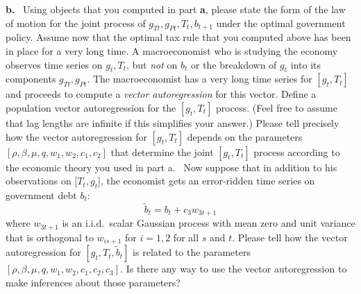 \medskip \noindent
{\bf b.} \ Using objects that you computed in part {\bf a}, please state
the form of the law of motion for the joint process of $g_{Tt},
g_{Pt}, T_t, b_{t+1}$ under the optimal government policy.
\medskip
{}  Assume now that the optimal tax
rule that you computed above has been in place for a very long
time.  A macroeconomist who is studying the  economy observes time
series on $g_t, T_t$, but {\it not\/} on  $b_t$ or the breakdown
of $g_t$ into its components $g_{Tt}, g_{Pt}$. The macroeconomist
has a very long time series for $[g_t, T_t]$ and proceeds to
compute a {\it vector autoregression\/} for this vector.
\medskip
{}  Define a population vector autoregression for
the $[g_t, T_t]$ process. (Feel free to assume that lag lengths
are infinite if this simplifies your answer.)
\medskip
{}  Please tell precisely how the vector
autoregression for $[g_t, T_t]$ depends on the parameters $[\rho,
\beta, \mu, q, w_1, w_2, c_1, c_2]$ that determine the joint
$[g_t, T_t]$ process according to the economic theory you used in
part a.
\medskip
{} \  Now suppose that in addition to his
observations on $[T_t, g_t$], the economist gets an error-ridden
time series on government debt $b_t$:
$$ \tilde b_t = b_t + c_3 w_{3t+1} $$
where $w_{3t+1}$ is an i.i.d.\ scalar Gaussian process with mean
zero and unit variance that is orthogonal to $w_{is+1}$ for
$i=1,2$ for all $s$ and $t$. Please tell how the vector
autoregression for $[g_t, T_t, \tilde b_t]$ is related to the
parameters $[\rho, \beta, \mu, q, w_1, w_2, c_1, c_2, c_3]$. Is
there any way to  use the vector autoregression to make inferences
about those parameters?






\medskip
{}  \quad
\medskip

